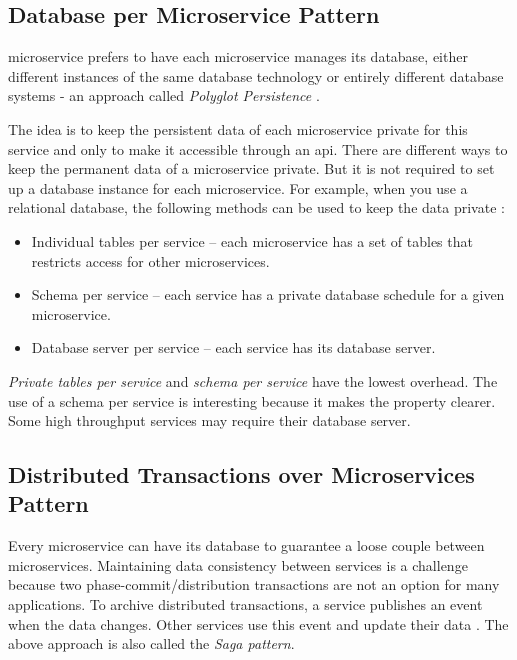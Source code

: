 \subsection{Database per Microservice Pattern}
\label{subse:database_per_service}

\acrshort{microservice} prefers to have each microservice manages its database, either different instances of the same database technology or entirely different database systems - an approach called \emph{Polyglot Persistence} \cite{LewisMicroservicesManagement}.

The idea is to keep the persistent data of each microservice private for this service and only to make it accessible through an \acrshort{api}.
There are different ways to keep the permanent data of a microservice private. But it is not required to set up a database instance for each microservice. For example, when you use a relational database, the following methods can be used to keep the data private \cite{RichardsonMicroservicesService}:
\begin{itemize}
    \item Individual tables per service -- each microservice has a set of tables that restricts access for other microservices.
    \item Schema per service -- each service has a private database schedule for a given microservice.
    \item Database server per service -- each service has its database server.
\end{itemize}

\emph{Private tables per service} and \emph{schema per service} have the lowest overhead. The use of a schema per service is interesting because it makes the property clearer. Some high throughput services may require their database server.

\subsection{Distributed Transactions over Microservices Pattern}
\label{subse:sagas}

Every microservice can have its database to guarantee a loose couple between microservices. Maintaining data consistency between services is a challenge because two phase-commit/distribution transactions are not an option for many applications. To archive distributed transactions, a service publishes an event when the data changes. Other services use this event and update their data \cite{RichardsonMicroservicesSagas}. The above approach is also called the \emph{Saga pattern}.

